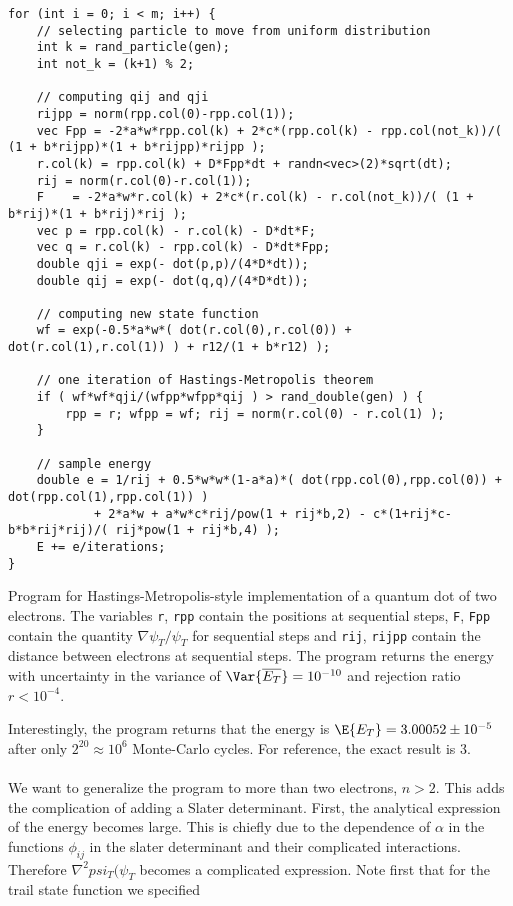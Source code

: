 \documentclass[11pt,english,a4paper]{article}
\begin{document}
\begin{table}
\begin{lstlisting}
for (int i = 0; i < m; i++) {
    // selecting particle to move from uniform distribution
    int k = rand_particle(gen);
    int not_k = (k+1) % 2;
    
    // computing qij and qji
    rijpp = norm(rpp.col(0)-rpp.col(1));
    vec Fpp = -2*a*w*rpp.col(k) + 2*c*(rpp.col(k) - rpp.col(not_k))/( (1 + b*rijpp)*(1 + b*rijpp)*rijpp );
    r.col(k) = rpp.col(k) + D*Fpp*dt + randn<vec>(2)*sqrt(dt);
    rij = norm(r.col(0)-r.col(1));
    F    = -2*a*w*r.col(k) + 2*c*(r.col(k) - r.col(not_k))/( (1 + b*rij)*(1 + b*rij)*rij );
    vec p = rpp.col(k) - r.col(k) - D*dt*F; 
    vec q = r.col(k) - rpp.col(k) - D*dt*Fpp;
    double qji = exp(- dot(p,p)/(4*D*dt)); 
    double qij = exp(- dot(q,q)/(4*D*dt));
    
    // computing new state function
    wf = exp(-0.5*a*w*( dot(r.col(0),r.col(0)) + dot(r.col(1),r.col(1)) ) + r12/(1 + b*r12) );
	
    // one iteration of Hastings-Metropolis theorem
    if ( wf*wf*qji/(wfpp*wfpp*qij ) > rand_double(gen) ) {
        rpp = r; wfpp = wf; rij = norm(r.col(0) - r.col(1) );
    }
    
    // sample energy
    double e = 1/rij + 0.5*w*w*(1-a*a)*( dot(rpp.col(0),rpp.col(0)) + dot(rpp.col(1),rpp.col(1)) )
            + 2*a*w + a*w*c*rij/pow(1 + rij*b,2) - c*(1+rij*c-b*b*rij*rij)/( rij*pow(1 + rij*b,4) );
    E += e/iterations;
}
\end{lstlisting}
\caption{Program for Hastings-Metropolis-style implementation of a quantum dot of two electrons. The variables \texttt{r}, \texttt{rpp} contain the positions at sequential steps, \texttt{F}, \texttt{Fpp} contain the quantity $\nabla \psi_T/\psi_T$ for sequential steps and \texttt{rij}, \texttt{rijpp} contain the distance between electrons at sequential steps. The program returns the energy with uncertainty in the variance of $\Var{\overline{E_T}} = 10^{-10}$ and rejection ratio $r < 10^{-4}$.}
\end{table}
Interestingly, the program returns that the energy is $\E{E_T} = 3.00052\pm 10^{-5}$ after only $2^{20} \approx 10^6$ Monte-Carlo cycles. For reference, the exact result is 3.\\
\\
We want to generalize the program to more than two electrons, $n>2$. This adds the complication of adding a Slater determinant. First, the analytical expression of the energy becomes large. This is chiefly due to the dependence of $\alpha$ in the functions $\phi_{ij}$ in the slater determinant and their complicated interactions. Therefore $\nabla^2 psi_T(\psi_T$ becomes a complicated expression. Note first that for the trail state function we specified
\end{document}
